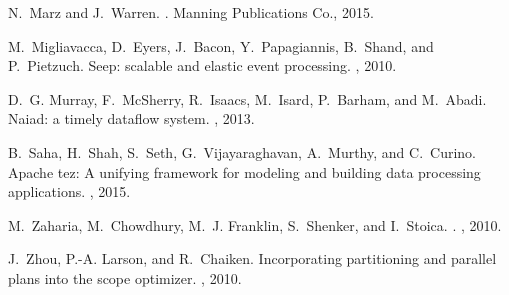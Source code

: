 \documentclass[11pt]{article}
\begin{document}
\begin{thebibliography}{10}
\begin{small}
N.~Marz and J.~Warren.
.
\newblock Manning Publications Co., 2015.

M.~Migliavacca, D.~Eyers, J.~Bacon, Y.~Papagiannis, B.~Shand, and P.~Pietzuch.
\newblock Seep: scalable and elastic event processing.
, 2010.

D.~G. Murray, F.~McSherry, R.~Isaacs, M.~Isard, P.~Barham, and M.~Abadi.
\newblock Naiad: a timely dataflow system.
, 2013.

B.~Saha, H.~Shah, S.~Seth, G.~Vijayaraghavan, A.~Murthy, and C.~Curino.
\newblock Apache tez: A unifying framework for modeling and building data
  processing applications.
, 2015.

M.~Zaharia, M.~Chowdhury, M.~J. Franklin, S.~Shenker, and I.~Stoica.
.
, 2010.

J.~Zhou, P.-A. Larson, and R.~Chaiken.
\newblock Incorporating partitioning and parallel plans into the scope
  optimizer.
, 2010.

\end{small}
\end{thebibliography}



% 
% 
\end{document}
